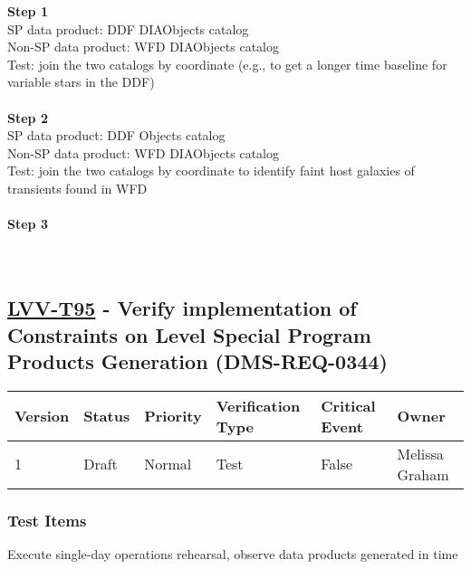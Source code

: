 \textbf{Step 1}\\
SP data product: DDF DIAObjects catalog\\
Non-SP data product: WFD DIAObjects catalog\\
Test: join the two catalogs by coordinate (e.g., to get a longer time
baseline for variable stars in the DDF)\\
~\\
\textbf{Step 2}\\
SP data product: DDF Objects catalog\\
Non-SP data product: WFD DIAObjects catalog\\
Test: join the two catalogs by coordinate to identify faint host
galaxies of transients found in WFD\\
~\\
\textbf{Step 3}\\
~\\
~\\

\hypertarget{lvv-t95---verify-implementation-of-constraints-on-level-special-program-products-generation-dms-req-0344}{%
\subsection{\texorpdfstring{\href{https://jira.lsstcorp.org/secure/Tests.jspa\#/testCase/LVV-T95}{LVV-T95}
- Verify implementation of Constraints on Level Special Program Products
Generation
(DMS-REQ-0344)}{LVV-T95 - Verify implementation of Constraints on Level Special Program Products Generation (DMS-REQ-0344)}}\label{lvv-t95---verify-implementation-of-constraints-on-level-special-program-products-generation-dms-req-0344}}

\begin{longtable}[]{@{}llllll@{}}
\toprule
Version & Status & Priority & Verification Type & Critical Event &
Owner\tabularnewline
\midrule
\endhead
1 & Draft & Normal & Test & False & Melissa Graham\tabularnewline
\bottomrule
\end{longtable}

\hypertarget{test-items-71}{%
\subsubsection{Test Items}\label{test-items-71}}

Execute single-day operations rehearsal, observe data products generated
in time\\
~\\

